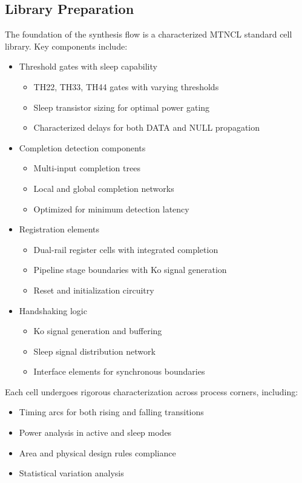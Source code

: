 \documentclass[conference]{IEEEtran}
\begin{document}
\subsection{Library Preparation}
The foundation of the synthesis flow is a characterized MTNCL standard cell library. Key components include:

\begin{itemize}
\item Threshold gates with sleep capability
  \begin{itemize}
  \item TH22, TH33, TH44 gates with varying thresholds
  \item Sleep transistor sizing for optimal power gating
  \item Characterized delays for both DATA and NULL propagation
  \end{itemize}
\item Completion detection components
  \begin{itemize}
  \item Multi-input completion trees
  \item Local and global completion networks
  \item Optimized for minimum detection latency
  \end{itemize}
\item Registration elements
  \begin{itemize}
  \item Dual-rail register cells with integrated completion
  \item Pipeline stage boundaries with Ko signal generation
  \item Reset and initialization circuitry
  \end{itemize}
\item Handshaking logic
  \begin{itemize}
  \item Ko signal generation and buffering
  \item Sleep signal distribution network
  \item Interface elements for synchronous boundaries
  \end{itemize}
\end{itemize}

Each cell undergoes rigorous characterization across process corners, including:
\begin{itemize}
\item Timing arcs for both rising and falling transitions
\item Power analysis in active and sleep modes
\item Area and physical design rules compliance
\item Statistical variation analysis
\end{itemize}
\end{document}
